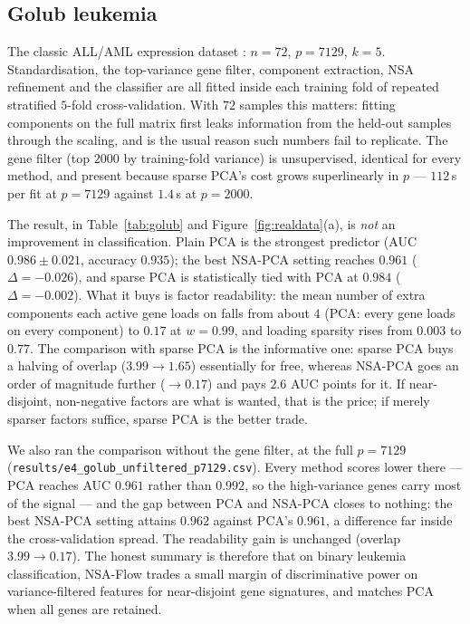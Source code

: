 \documentclass[11pt]{article}
\theoremstyle{definition}
\begin{document}


\subsection{Golub leukemia}

The classic ALL/AML expression dataset \citep{golub1999}: $n=72$, $p=7129$,
$k=5$. Standardisation, the top-variance gene filter, component extraction, NSA
refinement and the classifier are all fitted inside each training fold of
repeated stratified $5$-fold cross-validation. With $72$ samples this matters:
fitting components on the full matrix first leaks information from the held-out
samples through the scaling, and is the usual reason such numbers fail to
replicate. The gene filter (top $2000$ by training-fold variance) is
unsupervised, identical for every method, and present because sparse PCA's cost
grows superlinearly in $p$ --- $112$\,s per fit at $p=7129$ against $1.4$\,s at
$p=2000$.

The result, in Table~\ref{tab:golub} and Figure~\ref{fig:realdata}(a), is
\emph{not} an improvement in classification. Plain PCA is the strongest predictor
(AUC $0.986 \pm 0.021$, accuracy $0.935$); the best NSA-PCA setting reaches
$0.961$ ($\Delta = -0.026$), and sparse PCA is statistically tied with PCA at
$0.984$ ($\Delta = -0.002$). What it buys is factor readability: the mean number of
extra components each active gene loads on falls from about $4$ (PCA: every gene
loads on every component) to $0.17$ at $w=0.99$, and loading sparsity rises
from $0.003$ to $0.77$. The comparison with sparse PCA is the informative one:
sparse PCA buys a halving of overlap ($3.99 \to 1.65$) essentially for free,
whereas NSA-PCA goes an order of magnitude further ($\to 0.17$) and pays
$2.6$ AUC points for it. If near-disjoint, non-negative factors are what is
wanted, that is the price; if merely sparser factors suffice, sparse PCA is the
better trade.

We also ran the comparison without the gene filter, at the full $p=7129$
(\texttt{results/e4\_golub\_unfiltered\_p7129.csv}). Every method scores lower
there --- PCA reaches AUC $0.961$ rather than $0.992$, so the high-variance genes
carry most of the signal --- and the gap between PCA and NSA-PCA closes to
nothing: the best NSA-PCA setting attains $0.962$ against PCA's $0.961$, a
difference far inside the cross-validation spread. The readability gain is
unchanged (overlap $3.99 \to 0.17$). The honest summary is therefore that on
binary leukemia classification, NSA-Flow trades a small margin of discriminative
power on variance-filtered features for near-disjoint gene signatures, and
matches PCA when all genes are retained.
\end{document}
